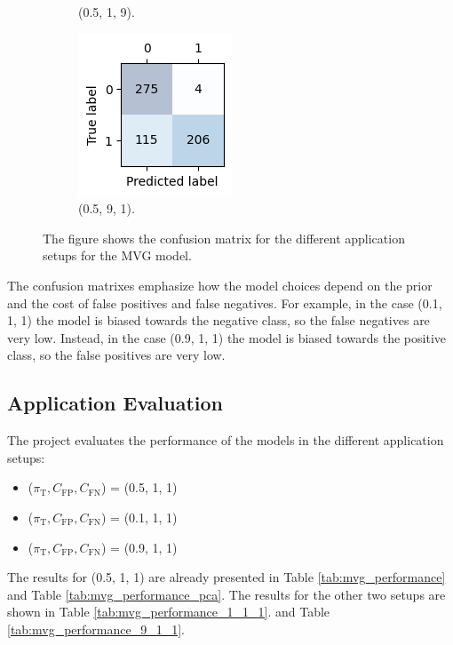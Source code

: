 \documentclass{article}
\begin{document}
\begin{figure}[ht]
\begin{subfigure}[b]{0.18\textwidth}
        \caption{(0.5, 1, 9).}
    \end{subfigure}
    \hfill
    \begin{subfigure}[b]{0.18\textwidth}
        \centering
        \includegraphics[width=\textwidth]{images/confusion_matrix_5_9_1.png}
        \caption{(0.5, 9, 1).}
    \end{subfigure}
    \caption{The figure shows the confusion matrix for the different application setups for the MVG model.}
    \label{fig:confusion_matrix}
\end{figure}

The confusion matrixes emphasize how the model choices depend on the prior and the cost of false positives and false negatives. For example, in the case (0.1, 1, 1) the model is biased towards the negative class, so the false negatives are very low. Instead, in the case (0.9, 1, 1) the model is biased towards the positive class, so the false positives are very low.

\subsection{Application Evaluation}
The project evaluates the performance of the models in the different application setups:
\begin{itemize}
    \item ($\pi_{\text{T}}, C_{\text{FP}}, C_{\text{FN}}$) = (0.5, 1, 1)
    \item ($\pi_{\text{T}}, C_{\text{FP}}, C_{\text{FN}}$) = (0.1, 1, 1)
    \item ($\pi_{\text{T}}, C_{\text{FP}}, C_{\text{FN}}$) = (0.9, 1, 1)
\end{itemize}
The results for (0.5, 1, 1) are already presented in Table \ref{tab:mvg_performance} and Table \ref{tab:mvg_performance_pca}. The results for the other two setups are shown in Table \ref{tab:mvg_performance_1_1_1}. and Table \ref{tab:mvg_performance_9_1_1}.
\end{document}
